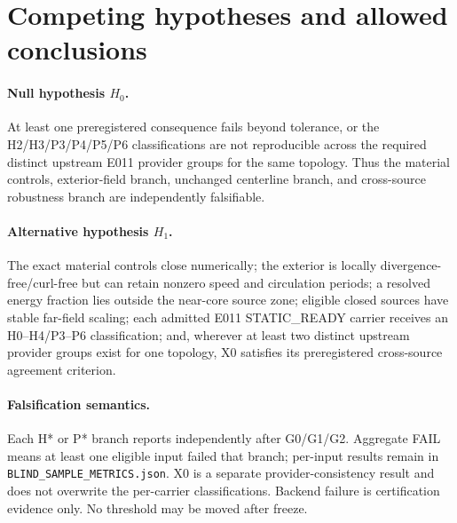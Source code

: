 \documentclass[11pt,a4paper]{article}
\begin{document}
\section{Competing hypotheses and allowed conclusions}
\paragraph{Null hypothesis $H_0$.}
At least one preregistered consequence fails beyond tolerance, or the H2/H3/P3/P4/P5/P6 classifications are not reproducible across the required distinct upstream E011 provider groups for the same topology. Thus the material controls, exterior-field branch, unchanged centerline branch, and cross-source robustness branch are independently falsifiable.

\paragraph{Alternative hypothesis $H_1$.}
The exact material controls close numerically; the exterior is locally divergence-free/curl-free but can retain nonzero speed and circulation periods; a resolved energy fraction lies outside the near-core source zone; eligible closed sources have stable far-field scaling; each admitted E011 STATIC\_READY carrier receives an H0--H4/P3--P6 classification; and, wherever at least two distinct upstream provider groups exist for one topology, X0 satisfies its preregistered cross-source agreement criterion.

\paragraph{Falsification semantics.}
Each H* or P* branch reports independently after G0/G1/G2. Aggregate FAIL means at least one eligible input failed that branch; per-input results remain in \texttt{BLIND\_SAMPLE\_METRICS.json}. X0 is a separate provider-consistency result and does not overwrite the per-carrier classifications. Backend failure is certification evidence only. No threshold may be moved after freeze.

\end{document}
